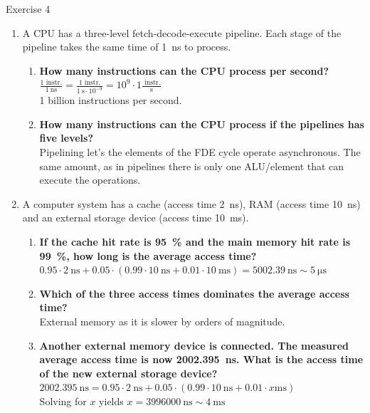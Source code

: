 \documentclass[10pt]{beamer}
\begin{document}
\begin{frame}[allowframebreaks]{Exercise 4}
	\begin{enumerate}
		\item A CPU has a three-level fetch-decode-execute pipeline. Each stage of the pipeline takes the same time of \SI{1}{\nano\second} to process.
			\begin{enumerate}
				\item \textbf{How many instructions can the CPU process per second?} \\
				$\frac{1 \text{ instr.}}{\SI{1}{\nano\second}} = \frac{1 \text{ instr.}}{\SI{1}{\second} \cdot 10^{-9}} = 10^9 \cdot 1 \frac{\text{ instr.}}{\si{\second}}$ \\
				1 billion instructions per second.
                
				\item \textbf{How many instructions can the CPU process if the pipelines has five levels?} \\
				Pipelining let's the elements of the FDE cycle operate asynchronous. 
				The same amount, as in pipelines there is only one ALU/element that can execute the operations.  
			\end{enumerate}
        \framebreak
        
        \item A computer system has a cache (access time \SI{2}{\nano\second}), RAM (access time \SI{10}{\nano\second}) and an external storage device (access time \SI{10}{\milli\second}). 
			\begin{enumerate}
				\item \textbf{If the cache hit rate is \SI{95}{\percent} and the main memory hit rate is \SI{99}{\percent}, how long is the average access time?} \\
 				$0.95 \cdot \SI{2}{\nano\second} + 0.05 \cdot (0.99 \cdot \SI{10}{\nano\second} + 0.01 \cdot \SI{10}{\milli\second}) =  \SI{5002.39}{\nano\second} \sim \SI{5}{\micro\second}$
				
				\item \textbf{Which of the three access times dominates the average access time?} \\
				External memory as it is slower by orders of magnitude.
				
				\item \textbf{Another external memory device is connected. The measured average access time is now \SI{2002.395}{\nano\second}. 
                    What is the access time of the new external storage device?}  \\
                    $ \SI{2002.395}{\nano\second} = 0.95 \cdot \SI{2}{\nano\second} + 0.05 \cdot (0.99 \cdot \SI{10}{\nano\second} + 0.01 \cdot x \si{\milli\second}) $\\
                    Solving for $x$ yields $x = \SI{3996000}{\nano\second} \sim \SI{4}{\milli\second}$
			\end{enumerate}
	\end{enumerate}

\end{frame}
\end{document}
